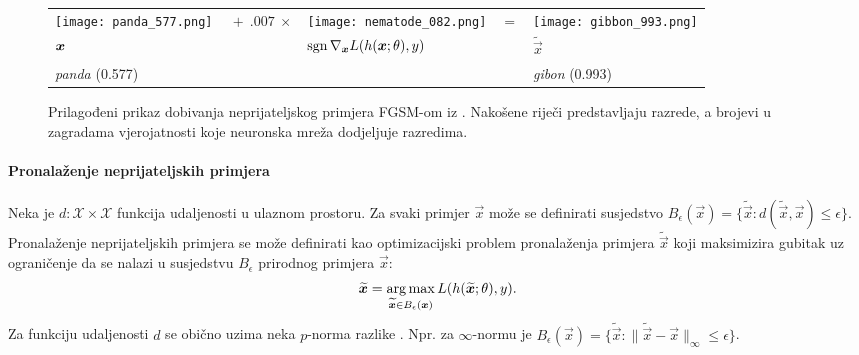 \documentclass[utf8, seminar, numeric, lmodern]{feri}
\begin{document}
\begin{figure}[htbp]
	\centering
	\begin{tabular}{>{\centering\arraybackslash}m{}m{.5in}>{\centering\arraybackslash}m{}m{.1in}>{\centering\arraybackslash}m{}}
		\centering\arraybackslash
		\texttt{[image: panda\_577.png]} &%
		\centering\arraybackslash%
		$\ +\ .007\ \times$ &%
		\texttt{[image: nematode\_082.png]} &%
		$=$ & %
		\texttt{[image: gibbon\_993.png]} \\
		$\centering \vec x$     &%
		& $\operatorname{sgn} \nabla_{\bm{x}} L(h(\bm{x}; \theta), y)$ & & $\widetilde{\vec x}$ \\
		\emph{panda} (0.577) & & & & \emph{gibon} (0.993) 
	\end{tabular}
	\caption{Prilagođeni prikaz dobivanja neprijateljskog primjera FGSM-om iz \cite{goodfellow14-ehae}. Nakošene riječi predstavljaju razrede, a brojevi u zagradama vjerojatnosti koje neuronska mreža dodjeljuje razredima.}
	\label{panda}
\end{figure}

\paragraph{Pronalaženje neprijateljskih primjera} Neka je $d:\mathcal{X}\times\mathcal{X}$ funkcija udaljenosti u ulaznom prostoru. Za svaki primjer $\vec x$ može se definirati susjedstvo $B_\epsilon(\vec x) = \{\widetilde{\vec x} : d(\widetilde{\vec x},\vec x)\leq\epsilon\}$. Pronalaženje neprijateljskih primjera se može definirati kao optimizacijski problem \cite{szegedy13-intrig-ipnn, cisse17-pn, madry17-tdlmraa} pronalaženja primjera $\widetilde{\vec x}$ koji maksimizira gubitak uz ograničenje da se nalazi u susjedstvu $B_\epsilon$ prirodnog primjera $\vec x$:
\begin{equation}
\widetilde{\bm{x}} = \operatorname*{arg\,max}_{\widetilde{\bm{x}}\in B_\epsilon(\bm{x})} L(h(\widetilde{\bm{x}}; \theta), y).
\end{equation}
Za funkciju udaljenosti $d$ se obično uzima neka $p$-norma razlike \cite{goodfellow14-ehae, cisse17-pn, madry17-tdlmraa}. Npr. za $\infty$-normu je $B_\epsilon(\vec x) = \{\widetilde{\vec x} : \lVert \widetilde{\vec x}-\vec x\rVert_\infty\leq\epsilon\}$.
\end{document}
